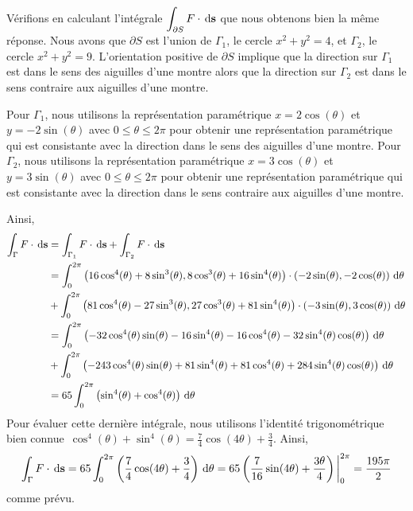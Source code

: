 {\begin{egg}
Vérifions en calculant l'intégrale
$\displaystyle \int_{\partial S} F \cdot \,\mathrm{d}\mathbf{s}$ que nous
obtenons bien la même réponse.  Nous avons que $\partial S$ est l'union de
$\Gamma_1$, le cercle $x^2+y^2 =4$, et $\Gamma_2$, le cercle
$x^2 + y^2 = 9$.  L'orientation positive de $\partial S$ implique que la
direction sur $\Gamma_1$ est dans le sens des aiguilles d'une montre
alors que la direction sur $\Gamma_2$ est dans le sens contraire aux
aiguilles d'une montre.

Pour $\Gamma_1$, nous utilisons la représentation paramétrique
$x = 2\cos(\theta)$ et $y = -2\sin(\theta)$ avec
$0 \leq \theta \leq 2\pi$ pour obtenir une représentation paramétrique
qui est consistante avec la direction dans le sens des aiguilles d'une
montre.  Pour $\Gamma_2$, nous utilisons la représentation paramétrique
$x = 3\cos(\theta)$ et $y = 3\sin(\theta)$ avec
$0 \leq \theta \leq 2\pi$ pour obtenir une représentation paramétrique
qui est consistante avec la direction dans le sens contraire aux
aiguilles d'une montre.

Ainsi,
\begin{align*}
\int_\Gamma F \cdot \,\mathrm{d}\mathbf{s}
&= \int_{\Gamma_1} F \cdot \,\mathrm{d}\mathbf{s}
+ \int_{\Gamma_2} F \cdot \,\mathrm{d}\mathbf{s} \\
&= \int_0^{2\pi} \left(16\cos^4(\theta) + 8 \sin^3(\theta),
8\cos^3(\theta) + 16 \sin^4(\theta)\right)\cdot
\left(-2\sin(\theta) , -2\cos(\theta)\right) \,\mathrm{d}\theta \\
&+ \int_0^{2\pi} \left(81\cos^4(\theta) - 27 \sin^3(\theta),
27\cos^3(\theta) + 81 \sin^4(\theta)\right)\cdot
\left(-3\sin(\theta) , 3\cos(\theta)\right) \,\mathrm{d}\theta \\
&= \int_0^{2\pi} \left(
-32 \cos^4(\theta)\sin(\theta) - 16 \sin^4(\theta) - 16 \cos^4(\theta)
    - 32 \sin^4(\theta) \cos(\theta)\right) \,\mathrm{d}\theta \\
&+ \int_0^{2\pi} \left( -243 \cos^4(\theta)\sin(\theta) +81
  \sin^4(\theta) + 81 \cos^4(\theta) + 284 \sin^4(\theta) \cos(\theta)
  \right) \,\mathrm{d}\theta \\
&= 65 \int_0^{2\pi} \left( \sin^4(\theta) + \cos^4(\theta)\right) \,\mathrm{d}\theta
\end{align*}
Pour évaluer cette dernière intégrale, nous utilisons l'identité
trigonométrique \lgm bien connue\rgm \ 
$\displaystyle \cos^4(\theta) + \sin^4(\theta) =
\frac{7}{4}\cos(4\theta) + \frac{3}{4}$.  Ainsi,
\[
  \int_\Gamma F \cdot \,\mathrm{d}\mathbf{s}
= 65 \int_0^{2\pi} \left( \frac{7}{4}\cos(4\theta) + \frac{3}{4}
  \right) \,\mathrm{d}\theta
= 65 \left( \frac{7}{16}\sin(4\theta) + \frac{3\theta}{4}
\right)\bigg|_0^{2\pi}
= \frac{195\pi}{2}
\]
comme prévu.
\end{egg}

}
